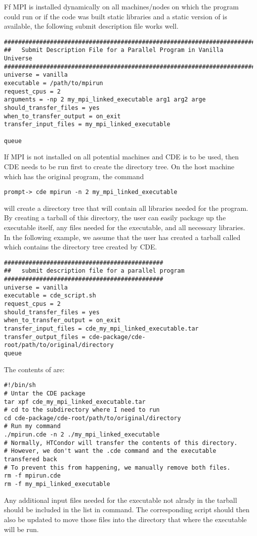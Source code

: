 Ff MPI is installed dynamically on all machines/nodes on which the program 
could run or if the code was built static libraries and a static version of 
 is available, the following
submit description file works well.
\begin{verbatim}
################################################################################
##   Submit Description File for a Parallel Program in Vanilla Universe
################################################################################
universe = vanilla
executable = /path/to/mpirun
request_cpus = 2
arguments = -np 2 my_mpi_linked_executable arg1 arg2 arge
should_transfer_files = yes
when_to_transfer_output = on_exit
transfer_input_files = my_mpi_linked_executable

queue
\end{verbatim}

If MPI is not installed on all potential machines and CDE is to be used,
then CDE needs to be run first to create the directory tree. On the host machine
which has the original program, the command

\begin{verbatim}
prompt-> cde mpirun -n 2 my_mpi_linked_executable
\end{verbatim}

will create a directory tree that will contain all libraries needed for the 
program. By creating a tarball of this directory, the user can easily package up
the executable itself, any files needed for the executable, and all necessary
libraries. In the following example, we assume that the user has created a 
tarball called  which contains the 
directory tree created by CDE.

\begin{verbatim}
#############################################
##   submit description file for a parallel program
#############################################
universe = vanilla
executable = cde_script.sh
request_cpus = 2
should_transfer_files = yes
when_to_transfer_output = on_exit
transfer_input_files = cde_my_mpi_linked_executable.tar
transfer_output_files = cde-package/cde-root/path/to/original/directory
queue
\end{verbatim}

The contents of  are:
\begin{verbatim}
#!/bin/sh
# Untar the CDE package
tar xpf cde_my_mpi_linked_executable.tar
# cd to the subdirectory where I need to run
cd cde-package/cde-root/path/to/original/directory
# Run my command
./mpirun.cde -n 2 ./my_mpi_linked_executable
# Normally, HTCondor will transfer the contents of this directory.
# However, we don't want the .cde command and the executable transfered back
# To prevent this from happening, we manually remove both files.
rm -f mpirun.cde
rm -f my_mpi_linked_executable
\end{verbatim}

Any additional input files needed for the executable not alrady in the tarball
should be included in the list in  command. 
The corresponding script should then also be updated to move those files into
the directory that where the executable will be run.


